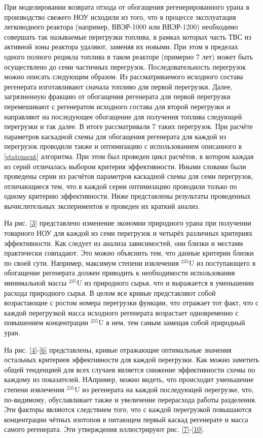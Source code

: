 {При моделировании возврата отхода от обогащения регенерированного урана в производство свежего НОУ исходили из того, что в процессе эксплуатация легководного реактора (например, ВВЭР-1000 или ВВЭР-1200) необходимо совершать так называемые перегрузки топлива, в рамках которых часть ТВС из активной зоны реактора удаляют, заменяя их новыми. При этом в пределах одного полного рецикла топлива в таком реакторе (примерно 7 лет) может быть осуществлено до семи частичных перегрузок. Последовательность перегрузок можно описать следующим образом. Из рассматриваемого исходного состава регенерата изготавливают сначала топливо для первой перегрузки. Далее, загрязненную фракцию от обогащения регенерата для первой перегрузки перемешивают с регенератом исходного состава для второй перегрузки и направляют на последующее обогащение для получения топлива следующей перегрузки и так далее. В итоге рассматривали 7 таких перегрузок. При расчёте параметров каскадной схемы для обогащения регенерата для каждой из перегрузок проводили также и оптимизацию с использованием описанного в \ref{statement} алгоритма. При этом был проведен цикл расчётов, в котором каждая из серий отличалась выбором критерия эффективности. Иными словами были проведены серии из расчётов параметров каскадной схемы для семи перегрузок, отличающиеся тем, что в каждой серии оптимизацию проводили только по одному критерию эффективности. Ниже представлены результаты проведенных вычислительных экспериментов и проведен их краткий анализ.

На рис. \ref{3} представлено изменение экономии природного урана при получении товарного НОУ для каждой из семи перегрузок и четырёх различных критериях эффективности. Как следует из анализа зависимостей, они близки и местами практически совпадают. Это можно объяснить тем, что данные критерии близки по своей сути. Например, максимум степени извлечения $^{235}$U из поступающего в обогащение регенерата должен приводить к необходимости использования минимальной массы $^{235}$U из природного сырья, что и выражается в уменьшении расхода природного сырья. В целом все кривые представляют собой возрастающие с ростом номера перегрузки функции, что отражает тот факт, что с каждой перегрузкой масса исходного регенерата возрастает одновременно с повышением концентрации $^{235}$U в нем, тем самым замещая собой природный уран.

На рис. \ref{4}-\ref{6} представлены, кривые отражающие оптимальные значения остальных критериев эффективности для каждой перегрузки. Как можно заметить общей тенденцией для всех случаев является снижение эффективности схемы по каждому из показателей. НАпример, можно видеть, что происходит уменьшение степени извлечения $^{235}$U из регенерата на каждой последующей перегрузке, что, по-видимому, обуславливает также и увеличение перерасхода работы разделения. Эти факторы являются следствием того, что с каждой перегрузкой повышаются концентрации чётных изотопов в питающем первый каскад регенерате и масса самого регенерата. Эти утверждения иллюстрируют рис. \ref{7}-\ref{10}.   


}
